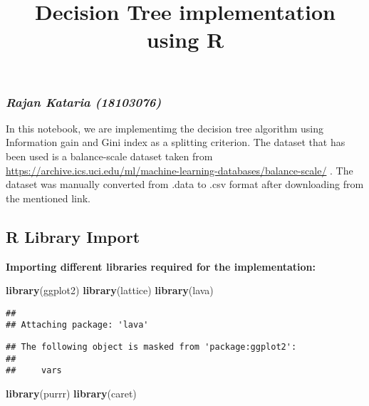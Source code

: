 \documentclass[
]{article}
\title{Decision Tree implementation using R}
\author{}
\date{\vspace{-2.5em}}
\newenvironment{Shaded}{\begin{snugshade}}{\end{snugshade}}
\newcommand{\KeywordTok}[1]{\textcolor[rgb]{0.13,0.29,0.53}{\textbf{#1}}}
\newcommand{\NormalTok}[1]{#1}
\begin{document}
\maketitle

\hypertarget{rajan-kataria-18103076}{%
\subsubsection{\texorpdfstring{\emph{Rajan Kataria
(18103076)}}{Rajan Kataria (18103076)}}\label{rajan-kataria-18103076}}

In this notebook, we are implementimg the decision tree algorithm using
Information gain and Gini index as a splitting criterion. The dataset
that has been used is a balance-scale dataset taken from
\url{https://archive.ics.uci.edu/ml/machine-learning-databases/balance-scale/}
. The dataset was manually converted from .data to .csv format after
downloading from the mentioned link.

\hypertarget{r-library-import}{%
\subsection{\texorpdfstring{\textbf{R Library
Import}}{R Library Import}}\label{r-library-import}}

\textbf{Importing different libraries required for the implementation:}

\begin{Shaded}
\begin{Highlighting}[]
\KeywordTok{library}\NormalTok{(ggplot2)}
\KeywordTok{library}\NormalTok{(lattice)}
\KeywordTok{library}\NormalTok{(lava)}
\end{Highlighting}
\end{Shaded}

\begin{verbatim}
## 
## Attaching package: 'lava'
\end{verbatim}

\begin{verbatim}
## The following object is masked from 'package:ggplot2':
## 
##     vars
\end{verbatim}

\begin{Shaded}
\begin{Highlighting}[]
\KeywordTok{library}\NormalTok{(purrr)}
\KeywordTok{library}\NormalTok{(caret)}
\end{Highlighting}
\end{Shaded}
\end{document}
